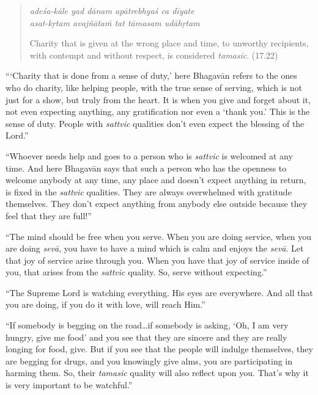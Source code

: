 \documentclass[12pt, twoside, openright]{memoir}
\begin{document}
\par
\begin{verse}
\textit{adeśa-kāle yad dānam apātrebhyaś ca dīyate} \\
\textit{asat-kṛtam avajñātaṁ tat tāmasam udāhṛtam}

\noindent Charity that is given at the wrong place and time, to unworthy recipients, with contempt and without respect, is considered \textit{tamasic}. (17.22)
\end{verse}
\par


\enquote{\enquote{Charity that is done from a sense of duty,} here Bhagavān refers to the ones who do charity, like helping people, with the true sense of serving, which is not just for a show, but truly from the heart. It is when you give and forget about it, not even expecting anything, any gratification nor even a \enquote{thank you.} This is the sense of duty. People with \textit{sattvic} qualities don’t even expect the blessing of the Lord.}

\enquote{Whoever needs help and goes to a person who is \textit{sattvic} is welcomed at any time. And here Bhagavān says that such a person who has the openness to welcome anybody at any time, any place and doesn’t expect anything in return, is fixed in the \textit{sattvic} qualities. They are always overwhelmed with gratitude themselves. They don’t expect anything from anybody else outside because they feel that they are full!}

\enquote{The mind should be free when you serve. When you are doing service, when you are doing \textit{sevā}, you have to have a mind which is calm and enjoys the \textit{sevā}. Let that joy of service arise through you. When you have that joy of service inside of you, that arises from the \textit{sattvic} quality. So, serve without expecting.}

\enquote{The Supreme Lord is watching everything. His eyes are everywhere. And all that you are doing, if you do it with love, will reach Him.}

\enquote{If somebody is begging on the road\ldots if somebody is asking, \enquote{Oh, I am very hungry, give me food} and you see that they are sincere and they are really longing for food, give. But if you see that the people will indulge themselves, they are begging for drugs, and you knowingly give alms, you are participating in harming them. So, their \textit{tamasic} quality will also reflect upon you. That’s why it is very important to be watchful.}
\end{document}
